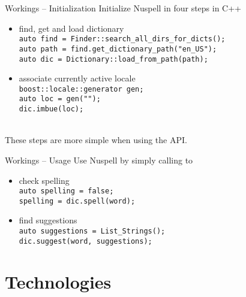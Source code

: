 \documentclass{beamer}
\begin{document}
\begin{frame}{Workings – Initialization}
Initialize Nuspell in four steps in C++\\\mbox{}
\begin{itemize}
\item find, get and load dictionary\\
\texttt{auto find = Finder::\alert{search\_all\_dirs\_for\_dicts}();\\
auto path = find.\alert{get\_dictionary\_path}("en\_US");\\
auto dic = Dictionary::\alert{load\_from\_path}(path);}
\\\mbox{}
\item associate currently active locale\\
\texttt{boost::locale::generator gen;\\
auto loc = gen("");\\
dic.\alert{imbue}(loc);}
\end{itemize}
\mbox{}\\
These steps are more simple when using the API.
\end{frame}

\begin{frame}{Workings – Usage}
Use Nuspell by simply calling to\\\mbox{}
\begin{itemize}
\item check spelling\\
\texttt{auto spelling = false;\\
spelling = dic.\alert{spell}(word);}
\\\mbox{}
\item find suggestions\\
\texttt{auto suggestions = List\_Strings();\\
dic.\alert{suggest}(word, suggestions);}
\end{itemize}
\end{frame}



\section{Technologies}
\end{document}
